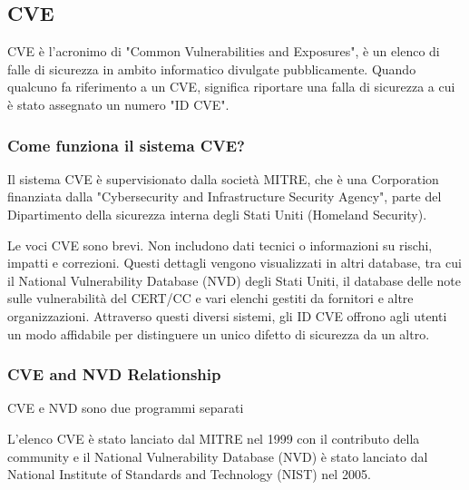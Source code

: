 \documentclass[a4paper,12pt]{article}
\begin{document}
\subsection{CVE}

CVE è l'acronimo di "Common Vulnerabilities and Exposures", è un elenco di falle di sicurezza in ambito informatico divulgate pubblicamente. Quando qualcuno fa riferimento a un CVE, significa riportare una falla di sicurezza a cui è stato assegnato un numero "ID CVE".


\subsubsection{Come funziona il sistema CVE?}
Il sistema CVE è supervisionato dalla società MITRE\cite{MITRE}, che è una Corporation finanziata dalla "Cybersecurity and Infrastructure Security Agency", parte del Dipartimento della sicurezza interna degli Stati Uniti (Homeland Security).

Le voci CVE sono brevi. Non includono dati tecnici o informazioni su rischi, impatti e correzioni. Questi dettagli vengono visualizzati in altri database, tra cui il National Vulnerability Database (NVD) degli Stati Uniti, il database delle note sulle vulnerabilità del CERT/CC e vari elenchi gestiti da fornitori e altre organizzazioni. Attraverso questi diversi sistemi, gli ID CVE offrono agli utenti un modo affidabile per distinguere un unico difetto di sicurezza da un altro.

\subsubsection{CVE and NVD Relationship\cite{MITRE}}

CVE e NVD sono due programmi separati

L'elenco CVE è stato lanciato dal MITRE nel 1999 con il contributo della community e il National Vulnerability Database (NVD) è stato lanciato dal National Institute of Standards and Technology (NIST) nel 2005.
\end{document}
